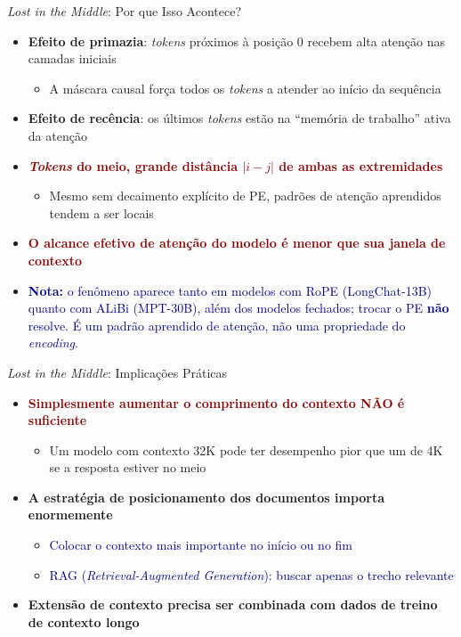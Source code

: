 \documentclass[aspectratio=169, xcolor=dvipsnames]{beamer}
\begin{document}
  \begin{frame}{\textit{Lost in the Middle}: Por que Isso Acontece?}
    \begin{itemize}
      \item \textbf{Efeito de primazia}: \textit{tokens} próximos à posição 0 recebem alta atenção nas camadas iniciais
        \begin{itemize}
          \item A máscara causal força todos os \textit{tokens} a atender ao início da sequência
        \end{itemize}
      \item \textbf{Efeito de recência}: os últimos \textit{tokens} estão na ``memória de trabalho'' ativa da atenção
      \item \textcolor{DarkRed}{\textbf{\textit{Tokens} do meio, grande distância $|i{-}j|$ de ambas as extremidades}}
        \begin{itemize}
          \item Mesmo sem decaimento explícito de PE, padrões de atenção aprendidos tendem a ser locais
        \end{itemize}
      \item \textcolor{DarkRed}{\textbf{O alcance efetivo de atenção do modelo é menor que sua janela de contexto}}
      \item \textcolor{DarkBlue}{\textbf{Nota:} o fenômeno aparece tanto em modelos com RoPE (LongChat-13B) quanto com ALiBi (MPT-30B), além dos modelos fechados; trocar o PE \textbf{não} resolve. É um padrão aprendido de atenção, não uma propriedade do \textit{encoding}.}
    \end{itemize}
  \end{frame}

  \begin{frame}{\textit{Lost in the Middle}: Implicações Práticas}
    \begin{itemize}
      \item \textcolor{DarkRed}{\textbf{Simplesmente aumentar o comprimento do contexto NÃO é suficiente}}
        \begin{itemize}
          \item Um modelo com contexto 32K pode ter desempenho pior que um de 4K se a resposta estiver no meio
        \end{itemize}
      \item \textbf{A estratégia de posicionamento dos documentos importa enormemente}
        \begin{itemize}
          \item \textcolor{DarkBlue}{Colocar o contexto mais importante no início ou no fim}
          \item \textcolor{DarkBlue}{RAG (\textit{Retrieval-Augmented Generation}): buscar apenas o trecho relevante}
        \end{itemize}
      \item \textbf{Extensão de contexto precisa ser combinada com dados de treino de contexto longo}
    \end{itemize}
  \end{frame}
\end{document}
